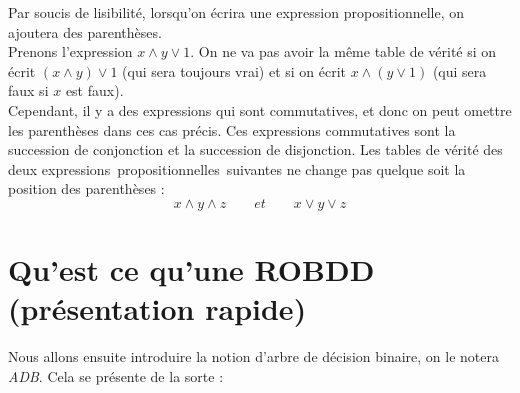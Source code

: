 \documentclass[a4paper, oneside]{report}
\newcommand{\expps}{expressions~propositionnelles~}
\begin{document}
Par soucis de lisibilité, lorsqu'on écrira une expression propositionnelle, on ajoutera des parenthèses.\\
Prenons l'expression $x\wedge y\vee 1$. On ne va pas avoir la même table de vérité si on écrit $(x\wedge y)\vee 1$ (qui sera toujours vrai) et si on écrit $x \wedge (y \vee 1)$ (qui sera faux si $x$ est faux).\\
Cependant, il y a des expressions qui sont commutatives, et donc on peut omettre les parenthèses dans ces cas précis. Ces expressions commutatives sont la succession de conjonction et la succession de disjonction. Les tables de vérité des deux \expps suivantes ne change pas quelque soit la position des parenthèses :
$$x \wedge y \wedge z \hspace{2em} et \hspace{2em} x \vee y \vee z$$

\section*{Qu'est ce qu'une ROBDD (présentation rapide)}

\noindent Nous allons ensuite introduire la notion d'arbre de décision binaire, on le notera \textit{ADB}. Cela se présente de la sorte :
\end{document}
